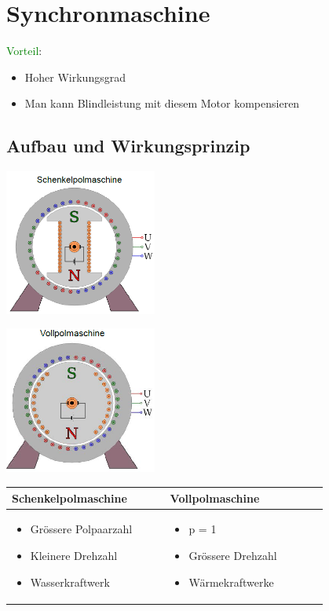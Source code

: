 \section{Synchronmaschine}
\textcolor{green}{Vorteil}: \begin{itemize} 
\item Hoher Wirkungsgrad
		 \item Man kann Blindleistung mit diesem Motor kompensieren
		\end{itemize}
\subsection{Aufbau und Wirkungsprinzip}
\begin{minipage}[b]{0.5\linewidth}
	\includegraphics[width = 5cm]{images/Schenkelpolmaschine}
\end{minipage}
\begin{minipage}[b]{0.5\linewidth}
	\includegraphics[width = 5cm]{images/Vollpolmaschine}
\end{minipage}
\begin{tabular}[b]{| C{0.4\linewidth} | C{0.4\linewidth} |}
	\hline
	\textbf{Schenkelpolmaschine} & \textbf{Vollpolmaschine} \\
	\hline
	\vspace{-0.7cm}
	\begin{itemize}
		\item Grössere Polpaarzahl
		\item Kleinere Drehzahl
		\item Wasserkraftwerk
	\end{itemize} & \vspace{-0.7cm}\begin{itemize}
	\item p = 1
	\item Grössere Drehzahl
	\item Wärmekraftwerke
\end{itemize} \\
	\hline
\end{tabular}\\

